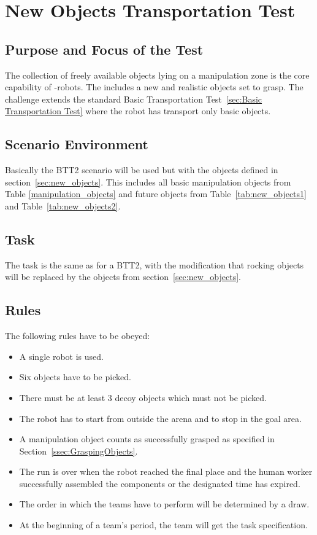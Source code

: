 \newpage
\section{New Objects Transportation Test}

\subsection{Purpose and Focus of the Test}
The collection of freely available objects lying on a manipulation zone is the core capability of \RCAW-robots. The  includes a new and realistic objects set to grasp. The challenge extends the standard Basic Transportation Test~\ref{sec:Basic Transportation Test} where the robot has transport only basic objects.

\subsection{Scenario Environment}
Basically the BTT2 scenario will be used but with the objects defined in section~\ref{sec:new_objects}. This includes all basic manipulation objects from Table \ref{manipulation_objects} and future objects from Table~\ref{tab:new_objects1} and Table~\ref{tab:new_objects2}.

\subsection{Task}
The task is the same as for a BTT2, with the modification that rocking objects will be replaced by the objects from section~\ref{sec:new_objects}. 


\subsection{Rules}
The following rules have to be obeyed:

\begin{itemize}
	\item A single robot is used.
	\item Six objects have to be picked.
	\item There must be at least 3 decoy objects which must not be picked.
	\item The robot has to start from outside the arena and to stop in the goal area.
	\item A manipulation object counts as successfully grasped as specified in Section~\ref{ssec:GraspingObjects}.
	\item The run is over when the robot reached the final place and the human worker successfully assembled the components or the designated time has expired.
	\item The order in which the teams have to perform will be determined by a draw.
	\item At the beginning of a team's period, the team will get the task specification.
\end{itemize}

